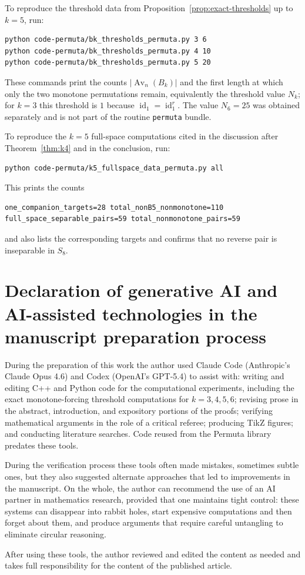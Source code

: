 \documentclass[11pt]{amsart}
\newcommand{\Sym}{S}
\newcommand{\Av}{\operatorname{Av}}
\newcommand{\id}{\operatorname{id}}
\theoremstyle{plain}
\theoremstyle{definition}
\theoremstyle{remark}
\begin{document}
To reproduce the threshold data from Proposition~\ref{prop:exact-thresholds} up to $k=5$, run:
\begin{verbatim}
python code-permuta/bk_thresholds_permuta.py 3 6
python code-permuta/bk_thresholds_permuta.py 4 10
python code-permuta/bk_thresholds_permuta.py 5 20
\end{verbatim}
These commands print the counts $|\Av_n(B_k)|$ and the first length at which only the two
monotone permutations remain, equivalently the threshold value $N_k$; for $k=3$ this threshold is
$1$ because $\id_1=\id_1^r$.  The value $N_6=25$ was obtained separately and is not part of
the routine \texttt{permuta} bundle.

To reproduce the $k=5$ full-space computations cited in the discussion after
Theorem~\ref{thm:k4} and in the conclusion, run:
\begin{verbatim}
python code-permuta/k5_fullspace_data_permuta.py all
\end{verbatim}
This prints the counts
\begin{verbatim}
one_companion_targets=28 total_nonB5_nonmonotone=110
full_space_separable_pairs=59 total_nonmonotone_pairs=59
\end{verbatim}
and also lists the corresponding targets and confirms that no reverse pair is
inseparable in $\Sym_8$.

\section*{Declaration of generative AI and AI-assisted technologies in the manuscript preparation process}

During the preparation of this work the author used Claude Code (Anthropic's
Claude Opus 4.6) and Codex (OpenAI's GPT-5.4) to assist with: writing and
editing C++ and Python code for the computational experiments, including the
exact monotone-forcing threshold computations for $k = 3, 4, 5, 6$; revising
prose in the abstract, introduction, and expository portions of the proofs;
verifying mathematical arguments in the role of a critical referee; producing
TikZ figures; and conducting literature searches. Code reused from the Permuta
library predates these tools.

During the verification process these tools often made mistakes, sometimes
subtle ones, but they also suggested alternate approaches that led to
improvements in the manuscript. On the whole, the author can recommend the
use of an AI partner in mathematics research, provided that one maintains
tight control: these systems can disappear into rabbit holes, start expensive
computations and then forget about them, and produce arguments that require
careful untangling to eliminate circular reasoning.

After using these tools, the author reviewed and edited the content as needed
and takes full responsibility for the content of the published article.



\end{document}
